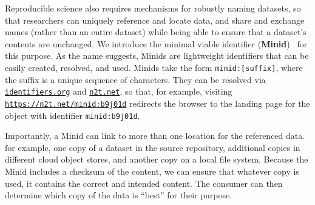 \documentclass[11pt]{article}
\begin{document}
Reproducible science also requires mechanisms for robustly naming datasets, 
so that researchers can uniquely reference and locate data,
and share and exchange names (rather than an entire dataset) while being able to ensure that a dataset's contents are unchanged.
We introduce the minimal viable identifier (\textbf{Minid})~\cite{chard16} for this purpose. 
As the name suggests, Minids are lightweight identifiers
that can be easily created, resolved, and used. 
Minids 
take the form \texttt{minid:[suffix]}, 
where 
the suffix is a unique sequence of characters.
%
They can be resolved via \texttt{\href{https://identifiers.org}{identifiers.org}} and \texttt{\href{https://n2t.net}{n2t.net}},
so that, for example, visiting
\texttt{\href{https://n2t.net/minid:b9j01d}{https://n2t.net/minid:b9j01d}} 
redirects the browser to the landing page for the
object with identifier \texttt{minid:b9j01d}.

Importantly, a Minid can link to more than one location for the referenced data.
for example, one copy of a dataset in the source repository, 
additional copies in different cloud object stores, and another copy on a local file system.
Because the Minid includes a checksum of the content, 
we can ensure that whatever copy is used, it contains the correct and intended content.
The consumer can then determine which copy of the data is ``best'' for their purpose.
\end{document}

